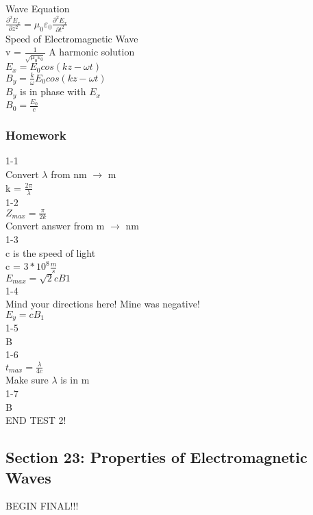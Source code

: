 \documentclass{article}
\begin{document}
\vspace{2mm}

\noindent
Wave Equation \\
$\frac{\partial^2 E_x}{\partial z^2} = \mu_0 \varepsilon_0 \frac{\partial^2 E_x}{\partial t^2}$ \\
Speed of Electromagnetic Wave \\
v = $\frac{1}{\sqrt{\mu_0 \varepsilon_0}}$
A harmonic solution \\
$E_x = E_0 cos(k z - \omega t)$ \\
$B_y = \frac{k}{\omega} E_0 cos (kz - \omega t)$ \\
$B_y$ is in phase with $E_x$ \\
$B_0 = \frac{E_0}{c}$

\subsubsection{Homework}
1-1 \\
Convert $\lambda$ from nm $\to$ m \\
k = $\frac{2 \pi}{\lambda}$ \\
1-2 \\
$Z_{max} = \frac{\pi}{2k}$ \\
Convert answer from m $\to$ nm \\
1-3 \\
c is the speed of light \\
c = $3*10^8 \frac{m}{s}$ \\
$E_{max} = \sqrt{2} c B1$ \\
1-4 \\
Mind your directions here! Mine was negative! \\
$E_y = c B_1$ \\
1-5 \\
B \\
1-6 \\
$t_{max} = \frac{\lambda}{4c}$ \\
Make sure $\lambda$ is in m \\
1-7 \\
B \\
END TEST 2!

\subsection{Section 23: Properties of Electromagnetic Waves}
\noindent
BEGIN FINAL!!!
\end{document}
